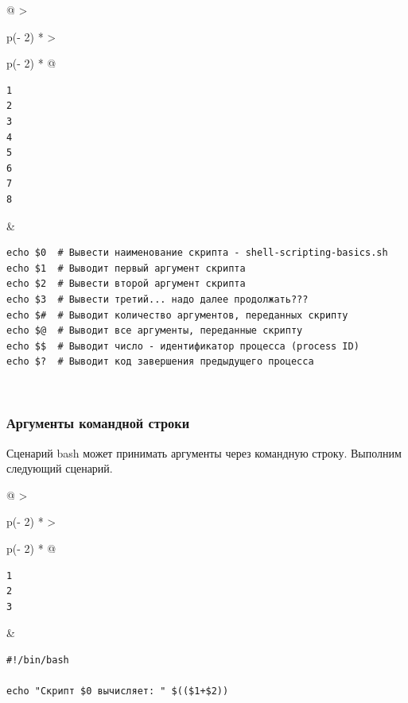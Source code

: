 \documentclass{article}
\begin{document}
\begin{longtable}[]{@{}
  >{\raggedright\arraybackslash}p{(\columnwidth - 2\tabcolsep) * }
  >{\raggedright\arraybackslash}p{(\columnwidth - 2\tabcolsep) * }@{}}
\toprule
\endhead
\begin{minipage}[t]{\linewidth}\raggedright
\begin{verbatim}
1
2
3
4
5
6
7
8
\end{verbatim}
\end{minipage} & \begin{minipage}[t]{\linewidth}\raggedright
\begin{verbatim}
echo $0  # Вывести наименование скрипта - shell-scripting-basics.sh
echo $1  # Выводит первый аргумент скрипта
echo $2  # Вывести второй аргумент скрипта
echo $3  # Вывести третий... надо далее продолжать???
echo $#  # Выводит количество аргументов, переданных скрипту
echo $@  # Выводит все аргументы, переданные скрипту
echo $$  # Выводит число - идентификатор процесса (process ID)
echo $?  # Выводит код завершения предыдущего процесса
\end{verbatim}
\end{minipage} \\ \addlinespace
\bottomrule
\end{longtable}

\hypertarget{Command-Line-Arguments}{%
\subsubsection{\texorpdfstring{\protect\hyperlink{Command-Line-Arguments}{}Аргументы
командной
строки}{Аргументы командной строки}}\label{Command-Line-Arguments}}

Сценарий bash может принимать аргументы через командную строку. Выполним
следующий сценарий.

\begin{longtable}[]{@{}
  >{\raggedright\arraybackslash}p{(\columnwidth - 2\tabcolsep) * }
  >{\raggedright\arraybackslash}p{(\columnwidth - 2\tabcolsep) * }@{}}
\toprule
\endhead
\begin{minipage}[t]{\linewidth}\raggedright
\begin{verbatim}
1
2
3
\end{verbatim}
\end{minipage} & \begin{minipage}[t]{\linewidth}\raggedright
\begin{verbatim}
#!/bin/bash

echo "Скрипт $0 вычисляет: " $(($1+$2))
\end{verbatim}
\end{minipage} \\ \addlinespace
\bottomrule
\end{longtable}
\end{document}
